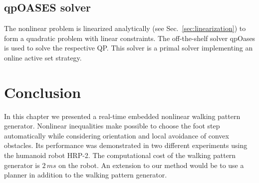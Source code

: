 \subsection{qpOASES solver}

The nonlinear problem is linearized analytically (see Sec.~\ref{sec:linearization}) to form a quadratic problem with linear constraints.
The off-the-shelf solver qpOases \cite{Ferreau2014} is used to solve the respective QP.
This solver is a primal solver implementing an online active set strategy.

\section{Conclusion}

In this chapter we presented a real-time embedded nonlinear walking pattern generator.
Nonlinear inequalities make possible to choose the foot step automatically while considering orientation
and local avoidance of convex obstacles.
Its performance was demonstrated in two different experiments using the humanoid robot \mbox{HRP-2}.
The computational cost of the walking pattern generator is $2 \,ms$ on the robot.
An extension to our method would be to use a planner in addition to the walking pattern generator.